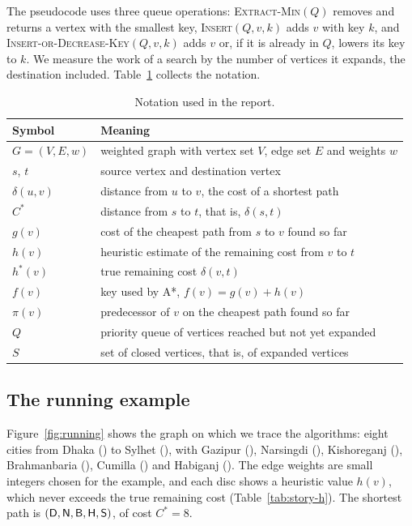The pseudocode uses three queue operations: \textsc{Extract-Min}$(Q)$ removes
and returns a vertex with the smallest key, \textsc{Insert}$(Q, v, k)$ adds $v$
with key $k$, and \textsc{Insert-or-Decrease-Key}$(Q, v, k)$ adds $v$ or, if it
is already in $Q$, lowers its key to $k$. We measure the work of a search by the
number of vertices it expands, the destination included.
Table~\ref{tab:notation} collects the notation.

\begin{table}[htbp]
  \centering
  \caption{Notation used in the report.}\label{tab:notation}
  \begin{tabular}{@{}ll@{}}
    \toprule
    Symbol & Meaning\\
    \midrule
    $G = (V,E,w)$ & weighted graph with vertex set $V$, edge set $E$ and weights $w$\\
    $s$, $t$      & source vertex and destination vertex\\
    $\delta(u,v)$ & distance from $u$ to $v$, the cost of a shortest path\\
    $C^{*}$       & distance from $s$ to $t$, that is, $\delta(s,t)$\\
    $g(v)$        & cost of the cheapest path from $s$ to $v$ found so far\\
    $h(v)$        & heuristic estimate of the remaining cost from $v$ to $t$\\
    $h^{*}(v)$    & true remaining cost $\delta(v,t)$\\
    $f(v)$        & key used by A*, $f(v) = g(v) + h(v)$\\
    $\pi(v)$      & predecessor of $v$ on the cheapest path found so far\\
    $Q$           & priority queue of vertices reached but not yet expanded\\
    $S$           & set of closed vertices, that is, of expanded vertices\\
    \bottomrule
  \end{tabular}
\end{table}

\subsection{The running example}\label{sec:running}

Figure~\ref{fig:running} shows the graph on which we trace the algorithms:
eight cities from Dhaka () to Sylhet (), with Gazipur (),
Narsingdi (), Kishoreganj (), Brahmanbaria (), Cumilla
() and Habiganj ().  The edge weights are small integers
chosen for the example, and each disc shows a heuristic value $h(v)$, which never
exceeds the true remaining cost (Table~\ref{tab:story-h}). The shortest path is
$(\textsf{D}, \textsf{N}, \textsf{B}, \textsf{H}, \textsf{S})$, of cost $C^{*} = 8$.

